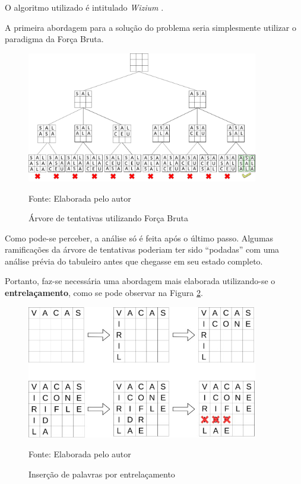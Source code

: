 O algoritmo utilizado é intitulado \textit{Wizium} \citep{wizium}.

A primeira abordagem para a solução do problema seria simplesmente utilizar o paradigma da Força Bruta.

\begin{figure}[H]
\centering
    \caption{Árvore de tentativas utilizando Força Bruta}
    \label{fig:crossTree}
    \includegraphics[width=0.9\textwidth]{Figuras/crosswordsTree.png}
    
    Fonte: Elaborada pelo autor
\end{figure}

Como pode-se perceber, a análise só é feita após o último passo. Algumas ramificações da árvore de tentativas poderiam ter sido ``podadas'' com uma análise prévia do tabuleiro antes que chegasse em seu estado completo.   

Portanto, faz-se necessária uma abordagem mais elaborada utilizando-se o \textbf{entrelaçamento}, como se pode observar na Figura \ref{fig:entrelacamento}. 

\begin{figure}[H] 
\centering
    \caption{Inserção de palavras por entrelaçamento}
    \label{fig:entrelacamento}
    \includegraphics[width=0.9\textwidth]{Figuras/entrelacamento.jpg}
    
    Fonte: Elaborada pelo autor
\end{figure}

